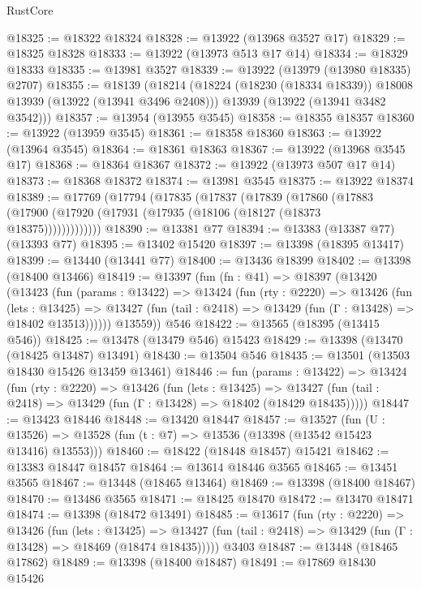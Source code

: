 \begin{lexlean}{RustCore}
\begin{coremodule}
@18325 := @18322 @18324
@18328 := @13922 (@13968 @3527 @17)
@18329 := @18325 @18328
@18333 := @13922 (@13973 @513 @17 @14)
@18334 := @18329 @18333
@18335 := @13981 @3527
@18339 := @13922 (@13979 (@13980 @18335) @2707)
@18355 := @18139
    (@18214
      (@18224 (@18230 (@18334 @18339)) @18008 @13939 (@13922 (@13941 @3496 @2408)))
      @13939
      (@13922 (@13941 @3482 @3542)))
@18357 := @13954 (@13955 @3545)
@18358 := @18355 @18357
@18360 := @13922 (@13959 @3545)
@18361 := @18358 @18360
@18363 := @13922 (@13964 @3545)
@18364 := @18361 @18363
@18367 := @13922 (@13968 @3545 @17)
@18368 := @18364 @18367
@18372 := @13922 (@13973 @507 @17 @14)
@18373 := @18368 @18372
@18374 := @13981 @3545
@18375 := @13922 @18374
@18389 := @17769
    (@17794
      (@17835
        (@17837
          (@17839
            (@17860
              (@17883 (@17900 (@17920 (@17931 (@17935 (@18106 (@18127 (@18373 @18375)))))))))))))
@18390 := @13381 @77
@18394 := @13383 (@13387 @77) (@13393 @77)
@18395 := @13402 @15420
@18397 := @13398 (@18395 @13417)
@18399 := @13440 (@13441 @77)
@18400 := @13436 @18399
@18402 := @13398 (@18400 @13466)
@18419 := @13397
    (fun (fn : @41) =>
    @18397
      (@13420
        (@13423
          (fun (params : @13422) =>
          @13424
            (fun (rty : @2220) =>
            @13426
              (fun (lets : @13425) =>
              @13427 (fun (tail : @2418) => @13429 (fun (Γ : @13428) => @18402 @13513))))))
        @13559))
    @546
@18422 := @13565 (@18395 (@13415 @546))
@18425 := @13478 (@13479 @546) @15423
@18429 := @13398 (@13470 (@18425 @13487) @13491)
@18430 := @13504 @546
@18435 := @13501 (@13503 @18430 @15426 @13459 @13461)
@18446 := fun (params : @13422) =>
  @13424
    (fun (rty : @2220) =>
    @13426
      (fun (lets : @13425) =>
      @13427 (fun (tail : @2418) => @13429 (fun (Γ : @13428) => @18402 (@18429 @18435)))))
@18447 := @13423 @18446
@18448 := @13420 @18447
@18457 := @13527
    (fun (U : @13526) => @13528 (fun (t : @7) => @13536 (@13398 (@13542 @15423 @13416) @13553)))
@18460 := @18422 (@18448 @18457) @15421
@18462 := @13383 @18447 @18457
@18464 := @13614 @18446 @3565
@18465 := @13451 @3565
@18467 := @13448 (@18465 @13464)
@18469 := @13398 (@18400 @18467)
@18470 := @13486 @3565
@18471 := @18425 @18470
@18472 := @13470 @18471
@18474 := @13398 (@18472 @13491)
@18485 := @13617
    (fun (rty : @2220) =>
    @13426
      (fun (lets : @13425) =>
      @13427 (fun (tail : @2418) => @13429 (fun (Γ : @13428) => @18469 (@18474 @18435)))))
    @3403
@18487 := @13448 (@18465 @17862)
@18489 := @13398 (@18400 @18487)
@18491 := @17869 @18430 @15426

\end{coremodule}
\end{lexlean}
